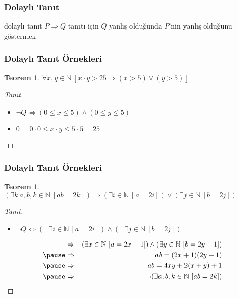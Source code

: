 \documentclass[dvipsnames]{beamer}
\theoremstyle{definition}
\theoremstyle{example}
\theoremstyle{plain}
\newtheorem{teorem}[theorem]{Teorem}
\begin{document}
\begin{frame}
  \frametitle{Dolaylı Tanıt}

  \begin{block}{dolaylı tanıt}
    $P \Rightarrow Q$ tanıtı için $Q$ yanlış olduğunda $P$'nin yanlış olduğunu
    göstermek
  \end{block}
\end{frame}

\begin{frame}
  \frametitle{Dolaylı Tanıt Örnekleri}

  \begin{teorem}
    $\forall x,y \in \mathbb{N}~[x \cdot y > 25
      \Rightarrow (x > 5) \vee (y > 5)]$
  \end{teorem}

  \pause
  \begin{proof}[Tanıt]
    \begin{itemize}
      \item $\neg Q \Leftrightarrow (0 \leq x \leq 5) \wedge (0 \leq y \leq 5)$

      \pause
      \item $0 = 0 \cdot 0 \leq x \cdot y \leq 5 \cdot 5 = 25$
    \end{itemize}
  \end{proof}
\end{frame}

\begin{frame}
  \frametitle{Dolaylı Tanıt Örnekleri}

  \begin{teorem}
    $(\exists k~a,b,k \in \mathbb{N}~[ab=2k]) \Rightarrow
      (\exists i \in \mathbb{N}~[a=2i]) \vee
      (\exists j \in \mathbb{N}~[b=2j])$
  \end{teorem}

  \pause
  \begin{proof}[Tanıt]
    \begin{itemize}
      \item $\neg Q \Leftrightarrow (\neg \exists i \in \mathbb{N}~[a=2i])
                          \wedge (\neg \exists j \in \mathbb{N}~[b=2j])$
    \end{itemize}

    \pause
    \begin{eqnarray*}
      & \Rightarrow & (\exists x \in \mathbb{N}~[a=2x+1])
               \wedge (\exists y \in \mathbb{N}~[b=2y+1])\\\pause
      & \Rightarrow & ab=(2x+1)(2y+1)\\\pause
      & \Rightarrow & ab=4xy+2(x+y)+1\\\pause
      & \Rightarrow & \neg (\exists a,b,k \in \mathbb{N}~[ab=2k])
    \end{eqnarray*}
  \end{proof}
\end{frame}
\end{document}
